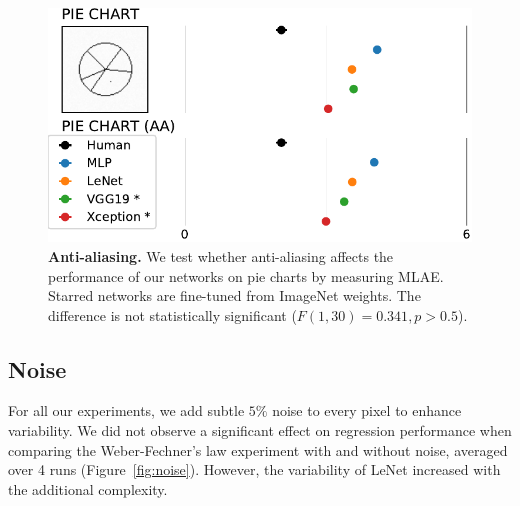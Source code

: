 \documentclass[journal]{vgtc}        %
\begin{document}
\begin{figure}[p]
\centering
\includegraphics[width=.825\linewidth]{../gfx/figure3_mlae_better_all_AA.pdf}
\caption{\textbf{Anti-aliasing.} We test whether anti-aliasing affects the performance of our networks on pie charts by measuring MLAE. Starred networks are fine-tuned from ImageNet weights. The difference is not statistically significant ($F(1,30)=0.341,p>0.5$).}
\label{fig:aa}
\end{figure}

\subsection{Noise}

For all our experiments, we add subtle $5\%$ noise to every pixel to enhance variability. We did not observe a significant effect on regression performance when comparing the Weber-Fechner's law experiment with and without noise, averaged over 4 runs (Figure~\ref{fig:noise}). However, the variability of LeNet increased with the additional complexity.
\end{document}
